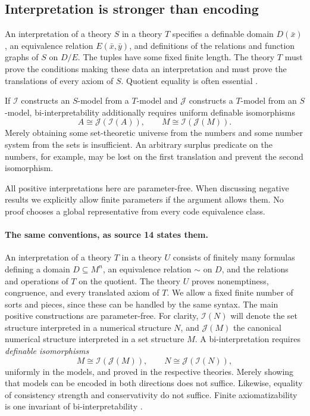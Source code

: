 \documentclass[11pt,letterpaper]{article}
\theoremstyle{definition}
\theoremstyle{remark}
\newcommand{\I}{\mathcal I}
\newcommand{\J}{\mathcal J}
\begin{document}
\subsection{Interpretation is stronger than encoding}

An interpretation of a theory $S$ in a theory $T$ specifies a definable domain
$D(\bar x)$, an equivalence relation $E(\bar x,\bar y)$, and definitions of the
relations and function graphs of $S$ on $D/E$. The tuples have some fixed finite
length. The theory $T$ must prove the conditions making these data an
interpretation and must prove the translations of every axiom of $S$. Quotient
equality is often essential \cite{FriedmanTarski}.

If $\I$ constructs an $S$-model from a $T$-model and $\J$ constructs a $T$-model
from an $S$-model, bi-interpretability additionally requires uniform definable
isomorphisms
\[
 A\cong \J(\I(A)),\qquad M\cong \I(\J(M)).
\]
Merely obtaining some set-theoretic universe from the numbers and some number
system from the sets is insufficient. An arbitrary surplus predicate on the
numbers, for example, may be lost on the first translation and prevent the second
isomorphism.

All positive interpretations here are parameter-free. When discussing negative
results we explicitly allow finite parameters if the argument allows them. No
proof chooses a global representative from every code equivalence class.

\paragraph{The same conventions, as source 14 states them.} An interpretation of
a theory $T$ in a theory $U$ consists of finitely many formulas defining a domain
$D\subseteq M^n$, an equivalence relation $\sim$ on $D$, and the relations and
operations of $T$ on the quotient. The theory $U$ proves nonemptiness,
congruence, and every translated axiom of $T$. We allow a fixed finite number of
sorts and pieces, since these can be handled by the same syntax. The main positive
constructions are parameter-free. For clarity, $\I(N)$ will denote the set
structure interpreted in a numerical structure $N$, and $\J(M)$ the canonical
numerical structure interpreted in a set structure $M$. A bi-interpretation
requires \emph{definable isomorphisms}
\[
 M\cong \I(\J(M)),\qquad N\cong \J(\I(N)),
\]
uniformly in the models, and proved in the respective theories. Merely showing
that models can be encoded in both directions does not suffice. Likewise,
equality of consistency strength and conservativity do not suffice. Finite
axiomatizability is one invariant of bi-interpretability \cite{FriedmanVisser}.
\end{document}

